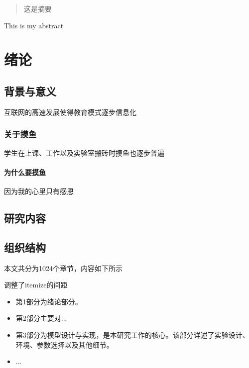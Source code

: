 \documentclass{ecnuthesis}
\begin{document}
\frontmatter

\begin{abstract}
  
 这是摘要
\end{abstract}

\begin{abstractEN}
  
 This is my abstract
\end{abstractEN}

\mainmatter

\chapter{绪论}
\section{背景与意义}
互联网的高速发展使得教育模式逐步信息化

\subsection{关于摸鱼}

学生在上课、工作以及实验室搬砖时摸鱼也逐步普遍

\subsubsection{为什么要摸鱼}

因为我的心里只有感恩

\section{研究内容}


\section{组织结构}
本文共分为1024个章节，内容如下所示

调整了itemize的间距
\begin{itemize}
    \item 第1部分为绪论部分。
    \item 第2部分主要对...
    \item 第3部分为模型设计与实现，是本研究工作的核心。该部分详述了实验设计、环境、参数选择以及其他细节。
    \item ...
\end{itemize}
\end{document}
